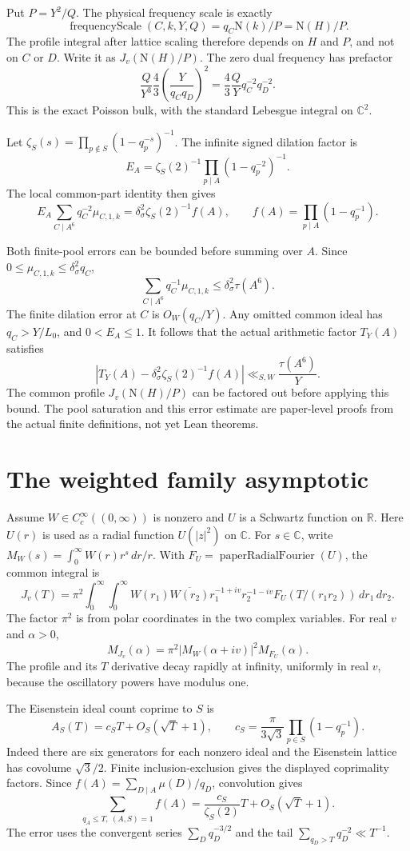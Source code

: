 \documentclass{article}
\newcommand{\Norm}{\mathrm N}
\begin{document}
Put $P=Y^2/Q$.
The physical frequency scale is exactly
\[
 \operatorname{frequencyScale}(C,k,Y,Q)
   =q_C\Norm(k)/P=\Norm(H)/P.
\]
The profile integral after lattice scaling therefore depends on $H$ and $P$,
and not on $C$ or $D$.
Write it as $J_v(\Norm(H)/P)$.
The zero dual frequency has prefactor
\[
 \frac{Q}{Y^3}\frac43\left(\frac{Y}{q_Cq_D}\right)^2
 =\frac43\frac QY q_C^{-2}q_D^{-2}.
\]
This is the exact Poisson bulk, with the standard Lebesgue integral on
$\mathbb C^2$.

Let $\zeta_S(s)=\prod_{p\notin S}(1-q_p^{-s})^{-1}$.
The infinite signed dilation factor is
\[
 E_A=\zeta_S(2)^{-1}\prod_{p\mid A}(1-q_p^{-2})^{-1}.
\]
The local common-part identity then gives
\[
 E_A\sum_{C\mid A^6}q_C^{-2}\mu_{C,1,k}
 =\delta_\sigma^2\zeta_S(2)^{-1} f(A),\qquad
 f(A)=\prod_{p\mid A}(1-q_p^{-1}).
\]

Both finite-pool errors can be bounded before summing over $A$.
Since $0\le\mu_{C,1,k}\le\delta_\sigma^2q_C$,
\[
 \sum_{C\mid A^6}q_C^{-1}\mu_{C,1,k}
 \le\delta_\sigma^2\tau(A^6).
\]
The finite dilation error at $C$ is $O_W(q_C/Y)$.
Any omitted common ideal has $q_C>Y/L_0$, and $0<E_A\le1$.
It follows that the actual arithmetic factor $T_Y(A)$ satisfies
\[
 \left|T_Y(A)-\delta_\sigma^2\zeta_S(2)^{-1}f(A)\right|
 \ll_{S,W}\frac{\tau(A^6)}Y.
\]
The common profile $J_v(\Norm(H)/P)$ can be factored out before applying
this bound.
The pool saturation and this error estimate are paper-level proofs from the
actual finite definitions, not yet Lean theorems.

\section*{The weighted family asymptotic}

Assume $W\in C_c^\infty((0,\infty))$ is nonzero and $U$ is a Schwartz
function on $\mathbb R$.
Here $U(r)$ is used as a radial function $U(|z|^2)$ on $\mathbb C$.
For $s\in\mathbb C$, write
$M_W(s)=\int_0^\infty W(r)r^s\,dr/r$.
With $F_U=\operatorname{paperRadialFourier}(U)$, the common integral is
\[
 J_v(T)=\pi^2\int_0^\infty\int_0^\infty
 W(r_1)\overline{W(r_2)}
 r_1^{-1+iv}r_2^{-1-iv}F_U(T/(r_1r_2))\,dr_1\,dr_2.
\]
The factor $\pi^2$ is from polar coordinates in the two complex variables.
For real $v$ and $\alpha>0$,
\[
 M_{J_v}(\alpha)
 =\pi^2|M_W(\alpha+iv)|^2 M_{F_U}(\alpha).
\]
The profile and its $T$ derivative decay rapidly at infinity, uniformly in
real $v$, because the oscillatory powers have modulus one.

The Eisenstein ideal count coprime to $S$ is
\[
 A_S(T)=c_ST+O_S(\sqrt T+1),\qquad
 c_S=\frac{\pi}{3\sqrt3}\prod_{p\in S}(1-q_p^{-1}).
\]
Indeed there are six generators for each nonzero ideal and the Eisenstein
lattice has covolume $\sqrt3/2$.
Finite inclusion-exclusion gives the displayed coprimality factors.
Since $f(A)=\sum_{D\mid A}\mu(D)/q_D$, convolution gives
\[
 \sum_{q_A\le T,\ (A,S)=1}f(A)
 =\frac{c_S}{\zeta_S(2)}T+O_S(\sqrt T+1).
\]
The error uses the convergent series $\sum_Dq_D^{-3/2}$ and the tail
$\sum_{q_D>T}q_D^{-2}\ll T^{-1}$.
\end{document}
